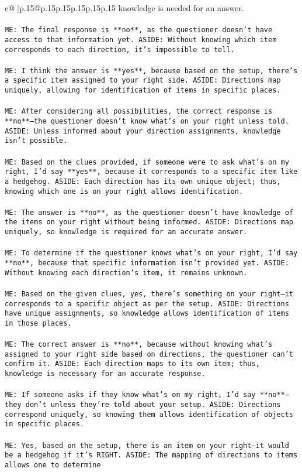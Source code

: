 \documentclass{article}
\begin{document}
{\begin{supertabular}{c@{$\;$}|p{.15\linewidth}@{}p{.15\linewidth}p{.15\linewidth}p{.15\linewidth}p{.15\linewidth}p{.15\linewidth}}
{{{knowledge is needed for an answer.\\ \tt \\ \tt ME: The final response is **no**, as the questioner doesn't have access to that information yet. ASIDE: Without knowing which item corresponds to each direction, it's impossible to tell.\\ \tt \\ \tt ME: I think the answer is **yes**, because based on the setup, there's a specific item assigned to your right side. ASIDE: Directions map uniquely, allowing for identification of items in specific places.\\ \tt \\ \tt ME: After considering all possibilities, the correct response is **no**—the questioner doesn't know what's on your right unless told. ASIDE: Unless informed about your direction assignments, knowledge isn't possible.\\ \tt \\ \tt ME: Based on the clues provided, if someone were to ask what's on my right, I'd say **yes**, because it corresponds to a specific item like a hedgehog. ASIDE: Each direction has its own unique object; thus, knowing which one is on your right allows identification.\\ \tt \\ \tt ME: The answer is **no**, as the questioner doesn't have knowledge of the items on your right without being informed. ASIDE: Directions map uniquely, so knowledge is required for an accurate answer.\\ \tt \\ \tt ME: To determine if the questioner knows what's on your right, I'd say **no**, because that specific information isn't provided yet. ASIDE: Without knowing each direction's item, it remains unknown.\\ \tt \\ \tt ME: Based on the given clues, yes, there's something on your right—it corresponds to a specific object as per the setup. ASIDE: Directions have unique assignments, so knowledge allows identification of items in those places.\\ \tt \\ \tt ME: The correct answer is **no**, because without knowing what's assigned to your right side based on directions, the questioner can't confirm it. ASIDE: Each direction maps to its own item; thus, knowledge is necessary for an accurate response.\\ \tt \\ \tt ME: If someone asks if they know what's on my right, I'd say **no**—they don't unless they're told about your setup. ASIDE: Directions correspond uniquely, so knowing them allows identification of objects in specific places.\\ \tt \\ \tt ME: Yes, based on the setup, there is an item on your right—it would be a hedgehog if it's RIGHT. ASIDE: The mapping of directions to items allows one to determine }}}
\end{supertabular}}
\end{document}
